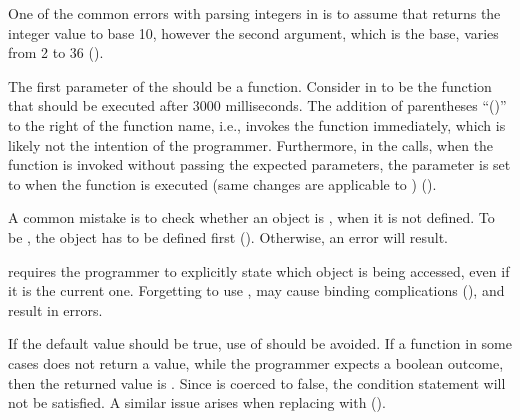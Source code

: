  One of the common errors with parsing integers
in \javascript is to assume that  returns the integer value to base 10, however the second argument, which is the base, varies from 2 to 36 (\cite{weylJsGotchas, burgess11jsMistakes}).

 The first parameter of the  should be a function. Consider  in 
 to be the function that should be executed after 3000 milliseconds.
The addition of parentheses ``()'' to the right 
of the function name, i.e.,  invokes the function immediately, which is likely not the intention of the programmer. Furthermore, in the  calls, when the function is invoked without
passing the expected parameters, the parameter is set to  when the function is executed (same changes are applicable to ) (\cite{hoPrematureInvocation, osmaniJsPatterns, gurbani13jsMistakes}).
% 

 A common mistake is to check whether an object is , when it is not defined. To be , the object has to be defined first (\cite{weylJsGotchas, roy3commmonJsMistakes,Crockford:2008}). Otherwise, an error will result. 

 \javascript requires the programmer to explicitly state which object
is being accessed, even if it is the current one. Forgetting to use , may cause binding complications (\cite{weylJsGotchas, porteneuveJsBinding, Crockford:2008}), and result in errors.

 If the default value should be true, use of  should be avoided. If a function in some cases does not
return a value, while the programmer expects a boolean outcome, then the returned value is .
Since  is coerced to false, the condition statement will not be satisfied. A similar issue arises  when replacing  with  (\cite{roy3commmonJsMistakes}). 
  
